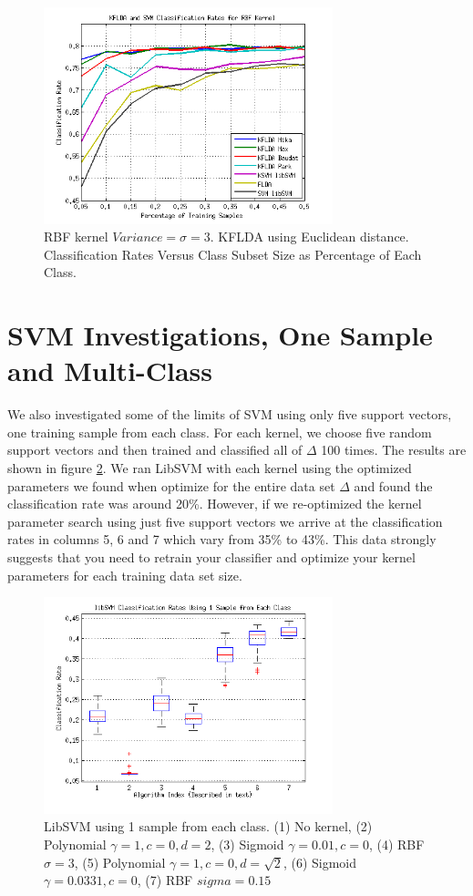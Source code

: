 \documentclass[journal]{IEEEtran}
\begin{document}
\begin{figure}[!h]
\centering
\includegraphics[width=3.3in]{../images/rbf_size_3.png}
\caption{RBF kernel \(Variance = \sigma = 3\). KFLDA using Euclidean distance. Classification Rates Versus Class Subset Size as Percentage of Each Class.}
\label{fig:rbf_size_eu}
\end{figure}

\section{SVM Investigations, One Sample and Multi-Class}
\par We also investigated some of the limits of SVM using only five support vectors, one training sample from each class. For each kernel, we choose five random support vectors and then trained and classified all of \(\Delta\) 100 times. The results are shown in figure \ref{fig:libsvm_1sample}. We ran LibSVM with each kernel using the optimized parameters we found when optimize for the entire data set \(\Delta\) and found the classification rate was around 20\%. However, if we re-optimized the kernel parameter search using just five support vectors we arrive at the classification rates in columns 5, 6 and 7 which vary from 35\% to 43\%. This data strongly suggests that you need to retrain your classifier and optimize your kernel parameters for each training data set size.

\begin{figure}[!h]
\centering
\includegraphics[width=3.3in]{../images/libSVM_1Sample.png}
\caption{LibSVM using 1 sample from each class. (1) No kernel, (2) Polynomial \(\gamma = 1, c=0, d=2\), (3) Sigmoid \(\gamma=0.01, c=0\), (4) RBF \(\sigma=3\), (5) Polynomial \(\gamma=1, c=0, d=\sqrt{2}\), (6) Sigmoid \(\gamma=0.0331, c=0\), (7) RBF \(sigma=0.15\)}
\label{fig:libsvm_1sample}
\end{figure}
\end{document}
